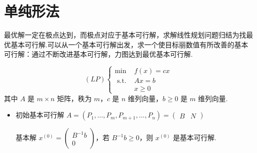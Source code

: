 \section{单纯形法}
\begin{note}
    最优解一定在极点达到，而极点对应于基本可行解，求解线性规划问题归结为找最优基本可行解.可以从一个基本可行解出发，求一个使目标丽数值有所改善的基本可行解：通过不断改进基本可行解，力图达到最优基本可行解.
\end{note}

\begin{note}
    \[(L P)\left\{\begin{array}{lc}
        \min & f(x)=c x \\
        \text { s.t. } & A x=b \\
        & x \geq 0
    \end{array}\right.\]
    其中 $A$ 是 $m \times n$ 矩阵，秩为 $m$，$c$ 是 $n$ 维列向量，$b\ge 0$ 是 $m$ 维列向量.
    \begin{itemize}
        \item 初始基本可行解
            $A = (P_1, \dots, P_m, P_{m + 1}, \dots, P_n) = \begin{pmatrix}
                B & N
            \end{pmatrix}$

            基本解 $x^{(0)} = \begin{pmatrix}
                B^{-1}b \\
                0
            \end{pmatrix}$，若 $B^{-1}b \ge 0$，则 $x^{(0)}$ 是基本可行解.


\end{itemize}
\end{note}
